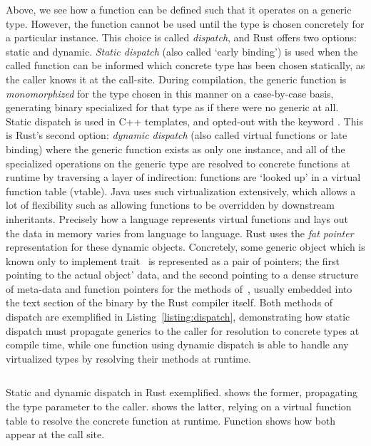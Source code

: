 Above, we see how a function can be defined such that it operates on a generic type. However, the function cannot be used until the type is chosen concretely for a particular instance. This choice is called \textit{dispatch}, and Rust offers two options: static and dynamic. \textit{Static dispatch} (also called `early binding') is used when the called function can be informed which concrete type has been chosen statically, as the caller knows it at the call-site. During compilation, the generic function is \textit{monomorphized} for the type chosen in this manner on a case-by-case basis, generating binary specialized for that type as if there were no generic at all. Static dispatch is used in C++ templates, and opted-out with the keyword . This is Rust's second option: \textit{dynamic dispatch} (also called virtual functions or late binding) where the generic function exists as only one instance, and all of the specialized operations on the generic type are resolved to concrete functions at runtime by traversing a layer of indirection: functions are `looked up' in a virtual function table (vtable). Java uses such virtualization extensively, which allows a lot of flexibility such as allowing functions to be overridden by downstream inheritants. Precisely how a language represents virtual functions and lays out the data in memory varies from language to language. Rust uses the \textit{fat pointer} representation for these dynamic objects. Concretely, some generic object which is known only to implement trait~ is represented as a pair of pointers; the first pointing to the actual object' data, and the second pointing to a dense structure of meta-data and function pointers for the methods of~, usually embedded into the text section of the binary by the Rust compiler itself. Both methods of dispatch are exemplified in Listing~\ref{listing:dispatch}, demonstrating how static dispatch must propagate generics to the caller for resolution to concrete types at compile time, while one function using dynamic dispatch is able to handle any virtualized types by resolving their methods at runtime.


\begin{listing}[ht]
	\centering
	\inputminted{rust}{dispatch.rs}
	\caption[Static vs dynamic dispatch in Rust.]{Static and dynamic dispatch in Rust exemplified.  shows the former, propagating the type parameter to the caller.  shows the latter, relying on a virtual function table to resolve the concrete function at runtime. Function  shows how both appear at the call site.}
	\label{listing:dispatch}
\end{listing}


